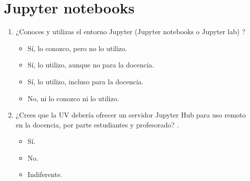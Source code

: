 \documentclass[a4paper,12pt]{article}
\newcounter{preg}[section]
\begin{document}
\section{Jupyter notebooks}
\begin{enumerate}
\item {} ¿Conoces y utilizas el entorno Jupyter (Jupyter notebooks o Jupyter lab) \cite{Barba2019}?
   \begin{itemize}
   \item Sí, lo conozco, pero no lo utilizo.
   \item Sí, lo utilizo, aunque no para la docencia.
   \item Sí, lo utilizo, incluso para la docencia.
   \item No, ni lo conozco ni lo utilizo.
   \end{itemize}

\item ¿Crees que la UV debería ofrecer un servidor Jupyter Hub para uso remoto en la docencia,
      por parte estudiantes y profesorado? \cite{JupyterHub}.
   \begin{itemize}
   \item Sí.
   \item No.
   \item Indiferente.
   \end{itemize}
\end{enumerate}
\end{document}
